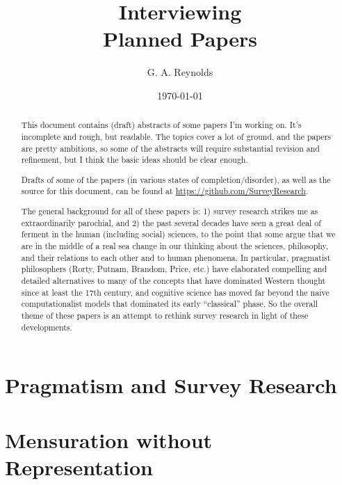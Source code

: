 \documentclass[11pt,twoside]{article}
\title{\SR{} Interviewing \\
\vspace{12pt}\Large{Planned Papers}}
\author{G. A. Reynolds}
\date{\today}
\newcommand{\SR}{Survey Research}
\begin{document}
\maketitle
\nocite{*}

\begin{abstract}
This document contains (draft) abstracts of some papers I'm working
on.  It's incomplete and rough, but readable.  The topics cover a lot
of ground, and the papers are pretty ambitious, so some of the
abstracts will require substantial revision and refinement, but I
think the basic ideas should be clear enough.

Drafts of some of the papers (in various states of
completion/disorder), as well as the source for this document, can be
found at \url{https://github.com/SurveyResearch}.

The general background for all of these papers is: 1) survey research
strikes me as extraordinarily parochial, and 2) the past several
decades have seen a great deal of ferment in the human (including
social) sciences, to the point that some argue that we are in the
middle of a real sea change in our thinking about the sciences,
philosophy, and their relations to each other and to human phenomena.
In particular, pragmatist philosophers (Rorty, Putnam, Brandom, Price,
etc.) have elaborated compelling and detailed alternatives to many of
the concepts that have dominated Western thought since at least the
17th century, and cognitive science has moved far beyond the naive
computationalist models that dominated its early ``classical'' phase.
So the overall theme of these papers is an attempt to rethink survey
research in light of these developments.
\end{abstract}

\tableofcontents

\newpage
\section{Pragmatism and \SR{}}

\begin{abstract}
\end{abstract}

\newpage
\section{Mensuration without Representation}
\end{document}
